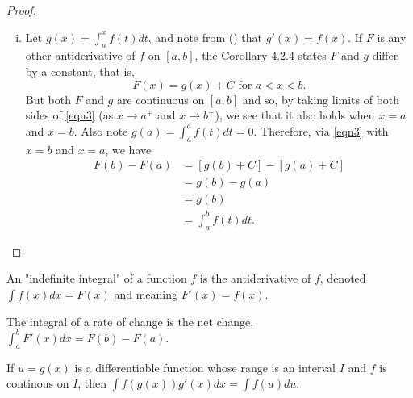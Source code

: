 \documentclass[a4paper,11pt]{article}
\begin{document}
\begin{outline}
\begin{proof}
\begin{enumerate}[i.]
          A similar proof of equation \eqref{eqn2} holds for \(h < 0\). Now let \(h\rightarrow 0\) which means
          \(u\rightarrow x\) and \(v\rightarrow x\) since \(u, v\in [x, x+h]\). Therefore \(\xlimit{h}{0}f(u) =
          \xlimit{u}{x}f(u)=f(x)\) and \(\xlimit{h}{0}f(v)=\xlimit{v}{x}f(v)=f(x)\). Then by equation \eqref{eqn2}
          and the Squeeze Theorem, \(g'(x) = \xlimit{h}{0}\frac{g(x+h)-g(x)}{h} = f(x)\). If \(x=a\) or \(x=b\),
          we consider \(g'(x)\) as a one sided-limit. Regardless, because \(g\) is differentiable, then \(g\) is
          continous on \([a,b]\).
        \item
          Let \(g(x)=\int_a^xf(t)dt\), and note from () that \(g'(x) = f(x)\). If \(F\) is any other
          antiderivative of \(f\) on \([a, b]\), the Corollary 4.2.4 states \(F\) and \(g\) differ by a constant, 
          that is,
          \begin{equation}
            \label{eqn3}
            F(x) = g(x) + C\text{ for }a < x < b\text{.}
          \end{equation}
          But both \(F\) and \(g\) are continuous on \([a, b]\) and so, by taking limits of both sides of 
          \eqref{eqn3} (as \(x\rightarrow a^{+}\) and \(x\rightarrow b^{-}\)), we see that it also holds when
          \(x = a\) and \(x = b\). Also note \(g(a) = \int_a^a f(t)dt = 0\). Therefore, via \eqref{eqn3}
          with \(x=b\) and \(x=a\), we have
          \begin{align*}
            F(b)-F(a) &= [g(b) + C] - [g(a) + C]\\
                      &= g(b)-g(a)\\
                      &= g(b)\\
                      &= \int_a^bf(t)dt\text{.}
          \end{align*}
      \end{enumerate}
    \end{proof}
    
    An "indefinite integral" of a function \(f\) is the antiderivative of \(f\), denoted \(\int f(x)dx=F(x)\)
    and meaning \(F'(x)=f(x)\).
    
    The integral of a rate of change is the net change, \(\int_a^bF'(x)dx = F(b)-F(a)\).
    
    If \(u=g(x)\) is a differentiable function whose range is an interval \(I\) and \(f\) is continous
    on \(I\), then \(\int f(g(x))g'(x)dx = \int f(u)du\).
    

\end{outline}
\end{document}
